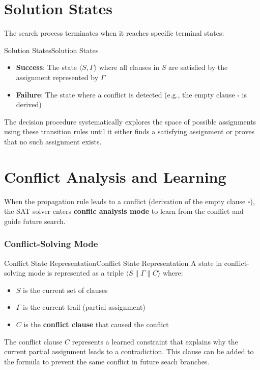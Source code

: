 \documentclass[a4paper]{article}
\theoremstyle{definition}
\begin{document}
\section{Solution States}
The search process terminates when it reaches specific terminal states:
\begin{definition}{Solution States}{Solution States}
\begin{itemize}
    \item \textbf{Success}: The state \( \langle S, \varGamma \rangle \) where all clauses in \( S \) are satisfied by the assignment represented by \( \varGamma \)     
    \item \textbf{Failure}: The state where a conflict is detected (e.g., the empty clause $\square$ is derived)
\end{itemize}
\end{definition}
The decision procedure systematically explores the space of possible assignments using these transition rules until it either finds a satisfying assignment 
or proves that no such assignment exists.
\section{Conflict Analysis and Learning}
When the propagation rule leads to a conflict (derivation of the empty clause $\square$), the SAT solver enters \textbf{conflic analysis mode}
to learn from the conflict and guide future search.
\subsubsection{Conflict-Solving Mode}
\begin{definition}{Conflict State Representation}{Conflict State Representation}
A state in conflict-solving mode is represented as a triple \( \langle S \parallel \varGamma \parallel C \rangle \) where:
\begin{itemize}
    \item \( S \) is the current set of clauses 
    \item \( \varGamma \) is the current trail (partial assignment)
    \item \( C \) is the \textbf{conflict clause} that caused the conflict
\end{itemize}
\end{definition}
The conflict clause \( C \) represents a learned constraint that explains why the current partial assignment leads to a contradiction. This clause 
can be added to the formula to prevent the same conflict in future seach branches.
\end{document}
